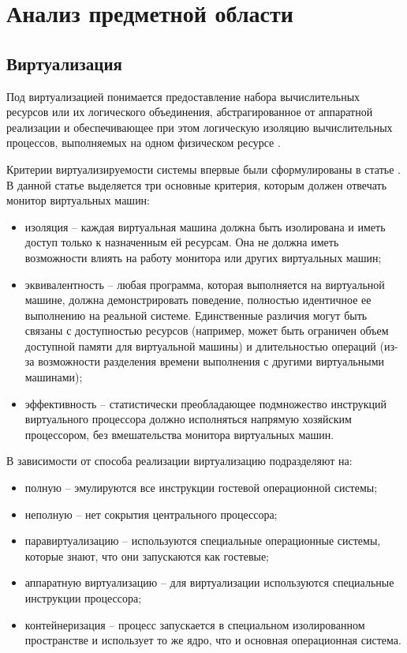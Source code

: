 \chapter{Анализ предметной области}

\section{Виртуализация}
Под виртуализацией понимается предоставление набора вычислительных ресурсов или их логического объединения, абстрагированное от аппаратной реализации и обеспечивающее при этом логическую изоляцию вычислительных процессов, выполняемых на одном физическом ресурсе \cite{алексеев2019гипервизоры}.

Критерии виртуализируемости системы впервые были сформулированы в статье \cite{virtReq}. В данной статье выделяется три основные критерия, которым должен отвечать монитор виртуальных машин:
\begin{itemize}
	\item изоляция -- каждая виртуальная машина должна быть изолирована и иметь доступ только к назначенным ей ресурсам. Она не должна иметь возможности влиять на работу монитора или других виртуальных машин;
	\item эквивалентность -- любая программа, которая выполняется на виртуальной машине, должна демонстрировать поведение, полностью идентичное ее выполнению на реальной системе. Единственные различия могут быть связаны с доступностью ресурсов (например, может быть ограничен объем доступной памяти для виртуальной машины) и длительностью операций (из-за возможности разделения времени выполнения с другими виртуальными машинами);
	\item эффективность -- статистически преобладающее подмножество инструкций виртуального процессора должно исполняться напрямую хозяйским процессором, без вмешательства монитора виртуальных машин.
\end{itemize}

В зависимости от способа реализации виртуализацию подразделяют \cite{admin} на:
\begin{itemize}
	\item полную -- эмулируются все инструкции гостевой операционной системы;
	\item неполную -- нет сокрытия центрального процессора; 
	\item паравиртуализацию -- используются специальные операционные системы, которые знают, что они запускаются как гостевые;
	\item аппаратную виртуализацию -- для виртуализации используются специальные инструкции процессора;
	\item контейнеризация -- процесс запускается в специальном изолированном пространстве и использует то же ядро, что и основная операционная система.
\end{itemize}

